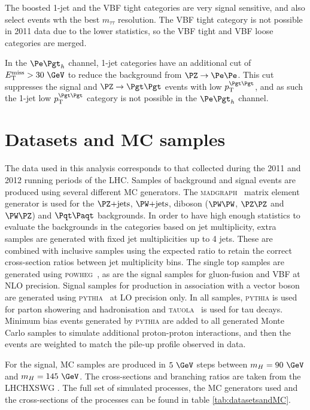 The boosted 1-jet and the VBF tight categories are very 
signal sensitive, and also select events wth the best $m_{\tau\tau}$ resolution.
The VBF tight category is not possible in 2011 data due to the lower statistics,
so the VBF tight and VBF loose categories are merged. 

In the $\etau$ channel, 1-jet categories have an additional cut of $\MET >
30~\GeV$ to reduce the background from $\PZ\to\Pe\Pe$. This cut suppresses the
signal and $\ZToTauTau$ events with low $\pt^{\Pgt\Pgt}$, and as such the 1-jet low
$\pt^{\Pgt\Pgt}$ category is not possible in the $\etau$ channel.  

\section{Datasets and \ac{MC} samples}
\label{sec:dataandMC}

The data used in this analysis corresponds to that collected during the 2011 and
2012 running periods of the \ac{LHC}. Samples of background and signal events are produced using several different
\ac{MC} generators. The \textsc{madgraph}~\cite{Alwall:2011uj} matrix element
generator is used for the $\ZJets$, $\WJets$, diboson ($\PW\PW$, $\PZ\PZ$ and
$\PW\PZ$) and $\ttbar$ backgrounds. 
In order to have high enough statistics to evaluate the
backgrounds in the categories based on jet multiplicity, extra samples are
generated with fixed jet multiplicities up to 4 jets. These are combined with
inclusive samples using the expected ratio to retain the correct cross-section
ratios between jet multiplicity bins. The single top samples are generated using
\textsc{powheg}~\cite{Frixione:2007vw,Alioli:2010xd,Alioli:2010xa}, as are the
signal samples for gluon-fusion and \ac{VBF} at \ac{NLO} precision. Signal
samples for production in association with a vector boson are generated using
\textsc{pythia}~\cite{Sjostrand:2006za} at \ac{LO} precision only. In all
samples, \textsc{pythia} is used for parton showering and hadronisation and
\textsc{tauola}~\cite{TAUOLA} is used for tau decays. Minimum bias events
generated by \textsc{pythia} are added to all generated Monte Carlo samples
to simulate additional proton-proton interactions, and then the events are
weighted to match the pile-up profile observed in data. 

For the signal, \ac{MC} samples are produced in $5~\GeV$ steps between
$m_{H}=90~\GeV$ and $m_{H}=145~\GeV$. The cross-sections and branching ratios 
are taken from the \ac{LHCHXSWG}
\cite{LHCHiggsCrossSectionWorkingGroup:2011ti,Dittmaier:2012vm,Heinemeyer:2013tqia}.
The full set of simulated processes, the \ac{MC} generators used and the
cross-sections of the processes can be found in table \ref{tab:datasetsandMC}.

